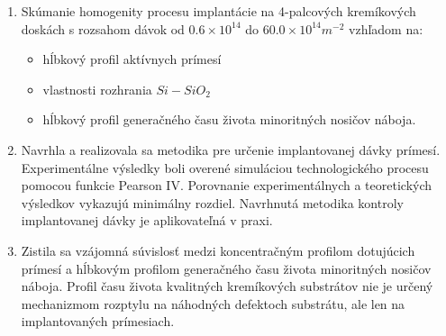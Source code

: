 \begin{enumerate}
\item Skúmanie homogenity procesu implantácie na 4-palcových
  kremíkových doskách s rozsahom dávok od $0.6 \times 10^{14}$ do
  $60.0 \times 10^{14} m^{-2}$ vzhľadom na:

  \begin{itemize}
  \item hĺbkový profil aktívnych prímesí
  \item vlastnosti rozhrania $Si-SiO_{2}$
  \item hĺbkový profil generačného času života minoritných nosičov
    náboja.
  \end{itemize}

\item Navrhla a realizovala sa metodika pre určenie implantovanej
  dávky prímesí. Experimentálne výsledky boli overené simuláciou
  technologického procesu pomocou funkcie Pearson IV\@. Porovnanie
  experimentálnych a teoretických výsledkov vykazujú minimálny
  rozdiel. Navrhnutá metodika kontroly implantovanej dávky je
  aplikovateľná v praxi.

\item Zistila sa vzájomná súvislosť medzi koncentračným profilom
  dotujúcich prímesí a hĺbkovým profilom generačného času života
  minoritných nosičov náboja. Profil času života kvalitných
  kremíkových substrátov nie je určený mechanizmom rozptylu na
  náhodných defektoch substrátu, ale len na implantovaných prímesiach.

\end{enumerate}
